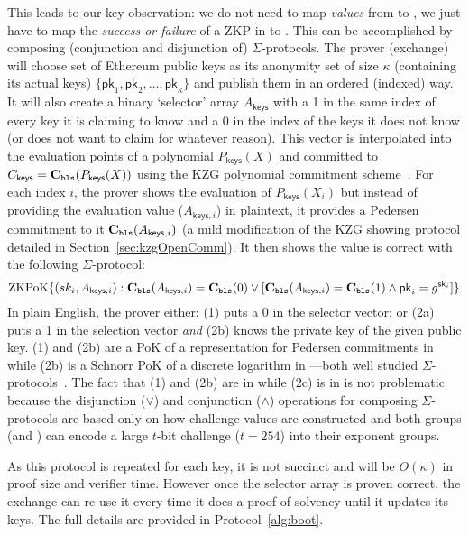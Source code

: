 This leads to our key observation: we do not need to map \textit{values} from \secp to \bls, we just have to map the \textit{success or failure} of a ZKP in \secp to \bls. This can be accomplished by composing (conjunction and disjunction of) $\Sigma$-protocols. The prover (exchange) will choose set of Ethereum public keys as its anonymity set of size $\kappa$ (containing its actual keys) $\{\mathsf{pk}_1,\mathsf{pk}_2,\dots,\mathsf{pk}_\kappa\}$ and publish them in an ordered (indexed) way. It will also create a binary `selector' array $A_\mathsf{keys}$ with a 1 in the same index of every key it is claiming to know and a 0 in the index of the keys it does not know (or does not want to claim for whatever reason). This vector is interpolated into the evaluation points of a polynomial $P_\mathsf{keys}(X)$  and committed to $C_\mathsf{keys}=\textbf{C}_\texttt{bls}(P_\mathsf{keys}(X))$ using the KZG polynomial commitment scheme~\cite{kzg}. For each index $i$, the prover shows the evaluation of $P_\mathsf{keys}(X_i)$ but instead of providing the evaluation value ($A_{\mathsf{keys},i}$) in plaintext, it provides a Pedersen commitment to it $\textbf{C}_\texttt{bls}(A_{\mathsf{keys},i})$ (a mild modification of the KZG showing protocol detailed in Section~\ref{sec:kzgOpenComm}). It then shows the value is correct with the following $\Sigma$-protocol:
\[ \mathrm{ZKPoK} \{ (sk_i,A_{\mathsf{keys},i}) : \textbf{C}_\texttt{bls}(A_{\mathsf{keys},i})=\textbf{C}_\texttt{bls}(0) \lor [\textbf{C}_\texttt{bls}(A_{\mathsf{keys},i})=\textbf{C}_\texttt{bls}(1) \land \mathsf{pk}_i=g^{\mathsf{sk}_i} ] \} \]
In plain English, the prover either: (1) puts a 0 in the selector vector; or (2a) puts a 1 in the selection vector \textit{and} (2b) knows the private key of the given public key. (1) and (2b) are a PoK of a representation for Pedersen commitments in \bls while (2b) is a Schnorr PoK of a discrete logarithm in \secp---both well studied $\Sigma$-protocols~\cite{damgard10,sigma}. The fact that (1) and (2b) are in \bls while (2c) is in \secp is not problematic because the disjunction ($\lor$) and conjunction ($\land$) operations for composing $\Sigma$-protocols are based only on how challenge values are constructed and both groups (\secp and \bls) can encode a large $t$-bit challenge (\eg $t=254$) into their exponent groups. 

As this protocol is repeated for each key, it is not succinct and will be $O(\kappa)$ in proof size and verifier time. However once the selector array is proven correct, the exchange can re-use it every time it does a proof of solvency until it updates its keys. The full details are provided in Protocol~\ref{alg:boot}.

